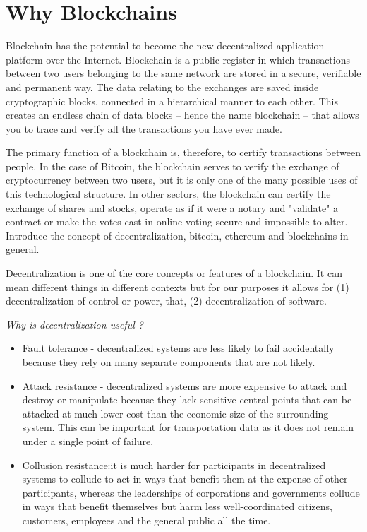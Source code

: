\section{Why Blockchains}\label{sec:blockchain}

Blockchain has the potential to become the new decentralized application platform over the Internet. Blockchain is a
public register in which transactions between two users belonging to the same network are stored in a secure, verifiable
and permanent way. The data relating to the exchanges are saved inside cryptographic blocks, connected in a hierarchical
manner to each other. This creates an endless chain of data blocks -- hence the name blockchain -- that allows you to
trace and verify all the transactions you have ever made.


 The primary function of a blockchain is, therefore, to certify transactions between people. In the case of Bitcoin, the
 blockchain serves to verify the exchange of cryptocurrency between two users, but it is only one of the many possible
 uses of this technological structure. In other sectors, the blockchain can certify the exchange of shares and stocks,
 operate as if it were a notary and "validate" a contract or make the votes cast in online voting secure and impossible
 to alter.
- Introduce the concept of decentralization, bitcoin, ethereum and blockchains in general.

Decentralization is one of the core concepts or features of a blockchain. It can mean different things in different
contexts but for our purposes it allows for (1) decentralization of control or power, that, (2) decentralization of
software.

{\em Why is decentralization useful ?}
\begin{itemize}

    \item Fault tolerance - decentralized systems are less likely to fail accidentally because they rely on many separate
components that are not likely.
    \item Attack resistance - decentralized systems are more expensive to attack and destroy or manipulate because they lack
sensitive central points that can be attacked at much lower cost than the economic size of the surrounding system. This
can be important for transportation data as it does not remain under a single point of failure.
    \item Collusion resistance:it is much harder for participants in decentralized systems to collude to act in ways that
benefit them at the expense of other participants, whereas the leaderships of corporations and governments collude in
ways that benefit themselves but harm less well-coordinated citizens, customers, employees and the general public all
the time.
\end{itemize}

